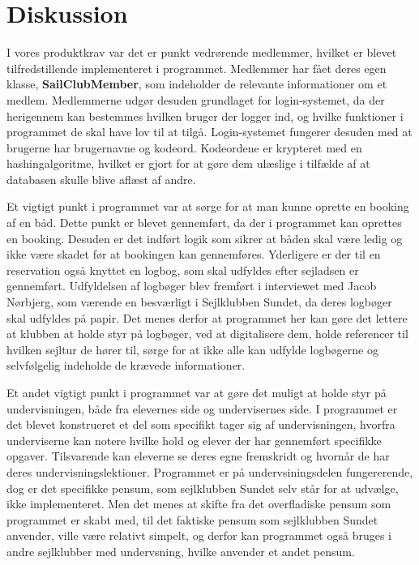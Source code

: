 \chapter{Diskussion}

\cbstart

I vores produktkrav var det er punkt vedrørende medlemmer, hvilket er blevet tilfredstillende implementeret i programmet. 
Medlemmer har fået deres egen klasse, \textbf{SailClubMember}, som indeholder de relevante informationer om et medlem. 
Medlemmerne udgør desuden grundlaget for login-systemet, da der herigennem kan bestemmes hvilken bruger der logger ind, og hvilke funktioner i programmet de skal have lov til at tilgå. 
Login-systemet fungerer desuden med at brugerne har brugernavne og kodeord. 
Kodeordene er krypteret med en hashingalgoritme, hvilket er gjort for at gøre dem ulæslige i tilfælde af at databasen skulle blive aflæst af andre. 

Et vigtigt punkt i programmet var at sørge for at man kunne oprette en booking af en båd. 
Dette punkt er blevet gennemført, da der i programmet kan oprettes en booking. 
Desuden er det indført logik som sikrer at båden skal være ledig og ikke være skadet før at bookingen kan gennemføres. 
Yderligere er der til en reservation også knyttet en logbog, som skal udfyldes efter sejladsen er gennemført. 
Udfyldelsen af logbøger blev fremført i interviewet med Jacob Nørbjerg, som værende en besværligt i Sejlklubben Sundet, da deres logbøger skal udfyldes på papir. 
Det menes derfor at programmet her kan gøre det lettere at klubben at holde styr på logbøger, ved at digitalisere dem, holde referencer til hvilken sejltur de hører til, sørge for at ikke alle kan udfylde logbøgerne og selvfølgelig indeholde de krævede informationer. 

Et andet vigtigt punkt i programmet var at gøre det muligt at holde styr på undervisningen, både fra elevernes side og undervisernes side. 
I programmet er det blevet konstrueret et del som specifikt tager sig af undervisningen, hvorfra underviserne kan notere hvilke hold og elever der har gennemført specifikke opgaver.
Tilsvarende kan eleverne se deres egne fremskridt og hvornår de har deres undervisningslektioner.
Programmet er på undervsiningsdelen fungererende, dog er det specifikke pensum, som sejlklubben Sundet selv står for at udvælge, ikke implementeret. 
Men det menes at skifte fra det overfladiske pensum som programmet er skabt med, til det faktiske pensum som sejlklubben Sundet anvender, ville være relativt simpelt, og derfor kan programmet også bruges i andre sejlklubber med undervsning, hvilke anvender et andet pensum.

